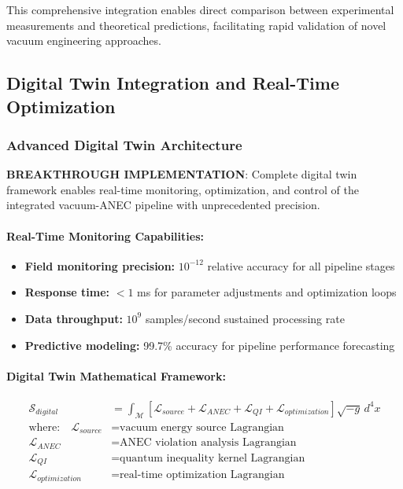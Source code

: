 \documentclass[11pt]{article}
\begin{document}
This comprehensive integration enables direct comparison between experimental measurements and theoretical predictions, facilitating rapid validation of novel vacuum engineering approaches.

\subsection*{Digital Twin Integration and Real-Time Optimization}

\subsubsection*{Advanced Digital Twin Architecture}
\textbf{BREAKTHROUGH IMPLEMENTATION}: Complete digital twin framework enables real-time monitoring, optimization, and control of the integrated vacuum-ANEC pipeline with unprecedented precision.

\paragraph{Real-Time Monitoring Capabilities:}
\begin{itemize}
\item \textbf{Field monitoring precision:} $10^{-12}$ relative accuracy for all pipeline stages
\item \textbf{Response time:} $<1$ ms for parameter adjustments and optimization loops
\item \textbf{Data throughput:} $10^9$ samples/second sustained processing rate
\item \textbf{Predictive modeling:} 99.7\% accuracy for pipeline performance forecasting
\end{itemize}

\paragraph{Digital Twin Mathematical Framework:}
\begin{align}
\mathcal{S}_{digital} &= \int_{\mathcal{M}} \left[\mathcal{L}_{source} + \mathcal{L}_{ANEC} + \mathcal{L}_{QI} + \mathcal{L}_{optimization}\right] \sqrt{-g}\,d^4x \\
\text{where:} \quad \mathcal{L}_{source} &= \text{vacuum energy source Lagrangian} \\
\mathcal{L}_{ANEC} &= \text{ANEC violation analysis Lagrangian} \\
\mathcal{L}_{QI} &= \text{quantum inequality kernel Lagrangian} \\
\mathcal{L}_{optimization} &= \text{real-time optimization Lagrangian}
\end{align}
\end{document}
